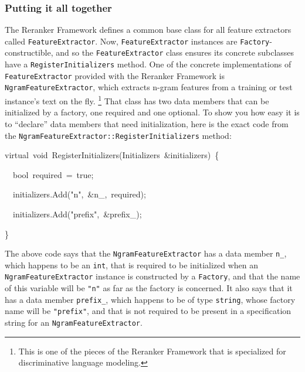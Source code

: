 \documentclass[a4paper]{article}
\let\textquotedbl="
\newenvironment{lyxcode}
{\par\begin{list}{}{
\scriptsize
\setlength{\leftmargin}{0.1in}
\setlength{\rightmargin}{\leftmargin}
\setlength{\listparindent}{0pt}%
\raggedright
\setlength{\itemsep}{0pt}
\setlength{\parsep}{0pt}
\normalfont\ttfamily}%
 \item[]}
{\end{list}}
\begin{document}
\subsubsection{Putting it all together}

The Reranker Framework defines a common base class for all feature
extractors called \texttt{FeatureExtractor}. Now, \texttt{FeatureExtractor}
instances are \texttt{Factory}-constructible, and so the \texttt{FeatureExtractor}
class ensures its concrete subclasses have a \texttt{RegisterInitializers}
method. One of the concrete implementations of \texttt{FeatureExtractor}
provided with the Reranker Framework is \texttt{NgramFeatureExtractor},
which extracts n-gram features from a training or test instance's
text on the fly.%
\footnote{This is one of the pieces of the Reranker Framework that is specialized
for discriminative language modeling.%
} That class has two data members that can be initialized by a factory,
one required and one optional. To show you how easy it is to \textquotedblleft{}declare\textquotedblright{}
data members that need initialization, here is the exact code from
the \texttt{NgramFeatureExtractor::RegisterInitializers} method:
\begin{lyxcode}
\tiny
virtual~void~RegisterInitializers(Initializers~\&initializers)~\{

~~bool~required~=~true;

~~initializers.Add(\textquotedbl{}n\textquotedbl{},~\&n\_,~required);

~~initializers.Add(\textquotedbl{}prefix\textquotedbl{},~\&prefix\_);

\}
\normalsize
\end{lyxcode}
The above code says that the \texttt{NgramFeatureExtractor} has a
data member \texttt{n\_}, which happens to be an \texttt{int}, that
is required to be initialized when an \texttt{NgramFeatureExtractor}
instance is constructed by a \texttt{Factory}, and that the name of
this variable will be \texttt{\textquotedbl{}n\textquotedbl{}} as
far as the factory is concerned. It also says that it has a data member
\texttt{prefix\_}, which happens to be of type \texttt{string}, whose
factory name will be \texttt{\textquotedbl{}prefix\textquotedbl{}},
and that is not required to be present in a specification string for
an \texttt{NgramFeatureExtractor}.
\end{document}
